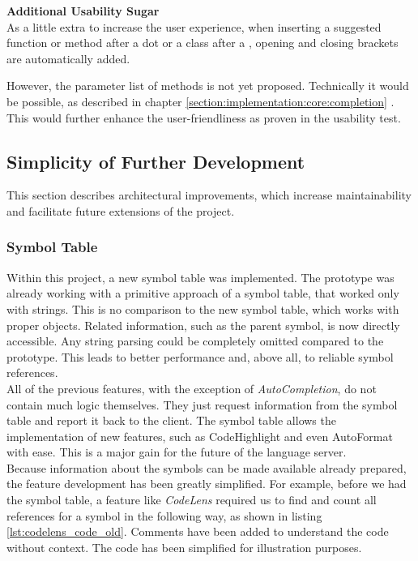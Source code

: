 \textbf{Additional Usability Sugar}\\
As a little extra to increase the user experience, when inserting a suggested function or method after a dot
or a class after a ,
opening and closing brackets are automatically added.

However, the parameter list of methods is not yet proposed.
Technically it would be possible, as described in chapter
\ref{section:implementation:core:completion} \textendash{} .
This would further enhance the user-friendliness as proven in the usability test.

\subsection{Simplicity of Further Development}
This section describes architectural improvements,
which increase maintainability and facilitate future extensions of the project.

\subsubsection{Symbol Table}
Within this project, a new symbol table was implemented.
The prototype was already working with a primitive approach of a symbol table, that worked only with strings.
This is no comparison to the new symbol table, which works with proper objects.
Related information, such as the parent symbol, is now directly accessible.
Any string parsing could be completely omitted compared to the prototype.
This leads to better performance and, above all, to reliable symbol references.\\

All of the previous features, with the exception of \textit{AutoCompletion}, do not contain much logic themselves.
They just request information from the symbol table and report it back to the client.
The symbol table allows the implementation of new features, such as CodeHighlight and even AutoFormat with ease.
This is a major gain for the future of the language server.\\


Because information about the symbols can be made available already prepared,
the feature development has been greatly simplified.
For example, before we had the symbol table,
a feature like \textit{CodeLens} required us to find and count all references for a symbol in the following way,
as shown in listing \ref{lst:codelens_code_old}.
Comments have been added to understand the code without context.
The code has been simplified for illustration purposes.

